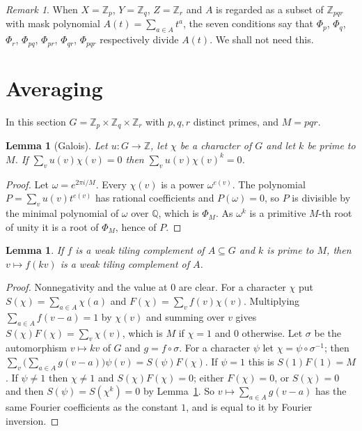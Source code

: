 \documentclass[11pt,a4paper]{amsart}
\newtheorem{lemma}[theorem]{Lemma}
\theoremstyle{definition}
\theoremstyle{remark}
\newtheorem{remark}[theorem]{Remark}
\newcommand{\Z}{\mathbb{Z}}
\newcommand{\Q}{\mathbb{Q}}
\begin{document}
\begin{remark}
When $X=\Z_p$, $Y=\Z_q$, $Z=\Z_r$ and $A$ is regarded as a subset of $\Z_{pqr}$ with mask polynomial
$A(t)=\sum_{a\in A}t^a$, the seven conditions say that $\Phi_p$, $\Phi_q$, $\Phi_r$, $\Phi_{pq}$, $\Phi_{pr}$,
$\Phi_{qr}$, $\Phi_{pqr}$ respectively divide $A(t)$. We shall not need this.
\end{remark}

\section{Averaging}\label{N:sec:avg}

In this section $G=\Z_p\times\Z_q\times\Z_r$ with $p,q,r$ distinct primes, and $M=pqr$.

\begin{lemma}[Galois]\label{N:lem:galois}
Let $u\colon G\to\Z$, let $\chi$ be a character of $G$ and let $k$ be prime to $M$. If $\sum_v u(v)\chi(v)=0$ then
$\sum_v u(v)\chi(v)^k=0$.
\end{lemma}
\begin{proof}
Let $\omega=e^{2\pi i/M}$. Every $\chi(v)$ is a power $\omega^{e(v)}$. The polynomial $P=\sum_v u(v)t^{e(v)}$ has
rational coefficients and $P(\omega)=0$, so $P$ is divisible by the minimal polynomial of $\omega$ over $\Q$,
which is $\Phi_M$. As $\omega^k$ is a primitive $M$-th root of unity it is a root of $\Phi_M$, hence of $P$.
\end{proof}

\begin{lemma}\label{N:lem:dil}
If $f$ is a weak tiling complement of $A\subseteq G$ and $k$ is prime to $M$, then $v\mapsto f(kv)$ is a weak
tiling complement of $A$.
\end{lemma}
\begin{proof}
Nonnegativity and the value at $0$ are clear. For a character $\chi$ put $S(\chi)=\sum_{a\in A}\chi(a)$ and
$F(\chi)=\sum_v f(v)\chi(v)$. Multiplying $\sum_{a\in A}f(v-a)=1$ by $\chi(v)$ and summing over $v$ gives
$S(\chi)F(\chi)=\sum_v\chi(v)$, which is $M$ if $\chi=1$ and $0$ otherwise. Let $\sigma$ be the automorphism
$v\mapsto kv$ of $G$ and $g=f\circ\sigma$. For a character $\psi$ let $\chi=\psi\circ\sigma^{-1}$; then
$\sum_v\bigl(\sum_{a\in A}g(v-a)\bigr)\psi(v)=S(\psi)F(\chi)$. If $\psi=1$ this is $S(1)F(1)=M$. If $\psi\ne1$ then
$\chi\neq 1$ and $S(\chi)F(\chi)=0$; either $F(\chi)=0$, or $S(\chi)=0$ and then $S(\psi)=S(\chi^k)=0$ by
Lemma~\ref{N:lem:galois}. So $v\mapsto\sum_{a\in A}g(v-a)$ has the same Fourier coefficients as the constant $1$, and is equal to it by
Fourier inversion.
\end{proof}
\end{document}
